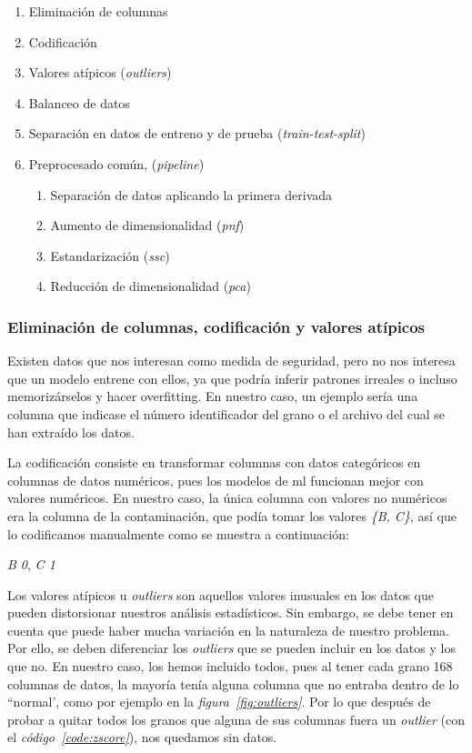 \begin{enumerate}
    \item Eliminación de columnas
    \item Codificación
    \item Valores atípicos (\textit{outliers})
    \item Balanceo de datos
    \item Separación en datos de entreno y de prueba (\textit{train-test-split})
    \item Preprocesado común, (\textit{pipeline})
    \begin{enumerate}
        \item Separación de datos aplicando la primera derivada 
        \item Aumento de dimensionalidad (\textit{\gls{pnf}})
        \item Estandarización  (\textit{\gls{ssc}})
        \item Reducción de dimensionalidad (\textit{\gls{pca}})
    \end{enumerate}
    
\end{enumerate}


\subsubsection{Eliminación de columnas, codificación y valores atípicos}

Existen datos que nos interesan como medida de seguridad, pero no nos interesa que un modelo entrene con ellos, ya que podría inferir patrones irreales o incluso memorizárselos y hacer \gls{overfitting}. En nuestro caso, un ejemplo sería una columna que indicase el número identificador del grano o el archivo del cual se han extraído los datos.

La codificación consiste en transformar columnas con datos categóricos en columnas de datos numéricos, pues los modelos de \acrshort{ml} funcionan mejor con valores numéricos. En nuestro caso, la única columna con valores no numéricos era la columna de la contaminación, que podía tomar los valores \textit{\{B, C\}}, así que lo codificamos manualmente como se muestra a continuación:

{\centering
    \textit{B \longrightarrow{} 0}, \textit{C \longrightarrow{} 1}\par
}

Los valores atípicos u \textit{outliers} son aquellos valores inusuales en los datos que pueden distorsionar nuestros análisis estadísticos. Sin embargo, se debe tener en cuenta que puede haber mucha variación en la naturaleza de nuestro problema. Por ello, se deben diferenciar los \textit{outliers} que se pueden incluir en los datos y los que no. En nuestro caso, los hemos incluido todos, pues al tener cada grano 168 columnas de datos, la mayoría tenía alguna columna que no entraba dentro de lo ``normal', como por ejemplo en la \textit{figura\ \ref{fig:outliers}}. Por lo que después de probar a quitar todos los granos que alguna de sus columnas fuera un \textit{outlier} (con el \textit{código\ \ref{code:zscore}}), nos quedamos sin datos.

